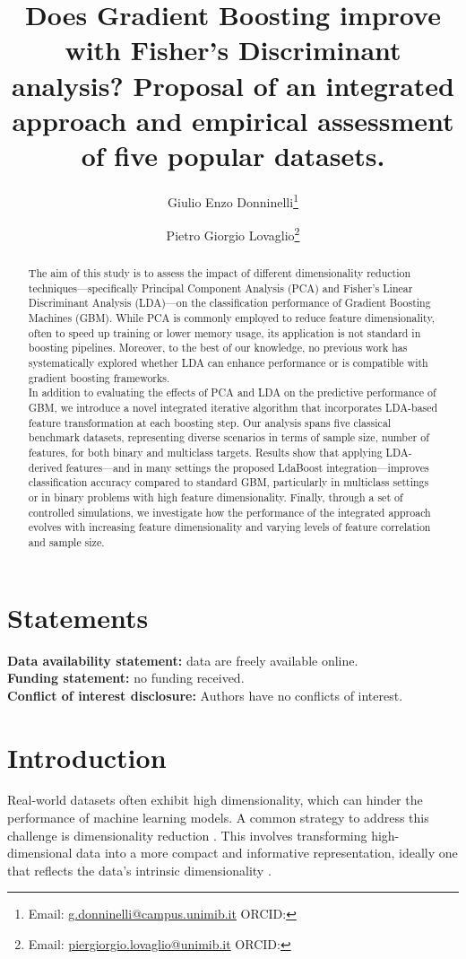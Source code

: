 \documentclass[11pt,a4paper]{article}
\title{Does Gradient Boosting improve with Fisher’s Discriminant analysis? Proposal of an integrated approach and empirical assessment of five popular datasets.}
\author[1]{Giulio Enzo Donninelli\thanks{Email: \href{mailto:g.donninelli@campus.unimib.it}{g.donninelli@campus.unimib.it} \quad ORCID: \orcidlink{0009-0009-7332-1159}}}
\author[1,2]{Pietro Giorgio Lovaglio\thanks{Email: \href{mailto:piergiorgio.lovaglio@unimib.it}{piergiorgio.lovaglio@unimib.it} \quad ORCID: \orcidlink{0000-0002-2340-0547}}}
\affil[1]{Dept of Statistics and Quantitative Methods, University of Milano-Bicocca, Milan, Italy}
\affil[2]{CRISP Research Center, University of Milano-Bicocca, Milan, Italy}
\date{} %
\begin{document}
\maketitle

\begin{abstract}
The aim of this study is to assess the impact of different dimensionality reduction techniques—specifically Principal Component Analysis (PCA) and Fisher's Linear Discriminant Analysis (LDA)—on the classification performance of Gradient Boosting Machines (GBM). While PCA is commonly employed to reduce feature dimensionality, often to speed up training or lower memory usage, its application is not standard in boosting pipelines. Moreover, to the best of our knowledge, no previous work has systematically explored whether LDA can enhance performance or is compatible with gradient boosting frameworks.\\[2ex]

In addition to evaluating the effects of PCA and LDA on the predictive performance of GBM, we introduce a novel integrated iterative algorithm that incorporates LDA-based feature transformation at each boosting step. Our analysis spans five classical benchmark datasets, representing diverse scenarios in terms of sample size, number of features, for both binary and multiclass targets. Results show that applying LDA-derived features—and in many settings the proposed LdaBoost integration—improves classification accuracy compared to standard GBM, particularly in multiclass settings or in binary problems with high feature dimensionality. Finally, through a set of controlled simulations, we investigate how the performance of the integrated approach evolves with increasing feature dimensionality and varying levels of feature correlation and sample size.

\end{abstract}

\section*{Statements}
\noindent\textbf{Data availability statement:} data are freely available online.\\
\textbf{Funding statement:} no funding received.\\
\textbf{Conflict of interest disclosure:} Authors have no conflicts of interest.

\newpage
\section{Introduction}
Real-world datasets often exhibit high dimensionality, which can hinder the performance of machine learning models. A common strategy to address this challenge is dimensionality reduction \citep{van2009dimensionality}. This involves transforming high-dimensional data into a more compact and informative representation, ideally one that reflects the data's intrinsic dimensionality \citep{huang2019review, bacanin2021dimensionality}.
\end{document}
